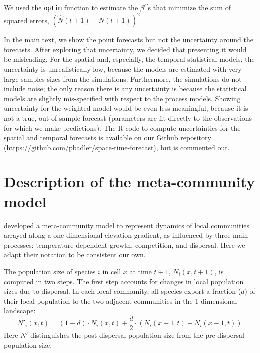 \documentclass[11pt]{article}
\begin{document}
We used the \texttt{optim} function to estimate the $\beta^C$s that minimize the sum of squared errors, $(\hat{N}(t+1) - N(t+1))^2$.

In the main text, we show the point forecasts but not the uncertainty around the forecasts. After exploring that uncertainty, we decided that presenting it would be misleading. For the spatial and, especially, the temporal statistical models, the uncertainty is unrealistically low, because the models are estimated with very large samples sizes from the simulations. Furthermore, the simulations do not include noise; the only reason there is any uncertainty is because the statistical models are slightly mis-specified with respect to the process models. Showing uncertainty for the weighted model would be even less meaningful, because it is not a true, out-of-sample forecast (parameters are fit directly to the observations for which we make predictions). The R code to compute uncertainties for the spatial and temporal forecasts is available on our Github repository (https://github.com/pbadler/space-time-forecast), but is commented out.

\section{Description of the meta-community model}\label{metacomm}

\cite{alexander_lags_2018} developed a meta-community model to represent dynamics of local communities arrayed along a one-dimensional elevation gradient, as influenced by three main processes: temperature-dependent growth, competition, and dispersal. Here we adapt their notation to be consistent our own.

The population size of species $i$ in cell $x$ at time $t + 1$, $N_{i}(x,t+1)$, is computed in two steps. The first step accounts for changes in local population sizes due to dispersal. In each local community, all species export a fraction ($d$) of their local population to the two adjacent communities in the 1-dimensional landscape:
\begin{equation}
N'_{i}(x,t) = (1-d) \cdot N_{i}(x,t) + \frac{d}{2} \cdot (N_{i}(x+1,t) + N_{i}(x-1,t))
\end{equation}
Here $N'$ distinguishes the post-dispersal population size from the pre-dispersal population size.
\end{document}
